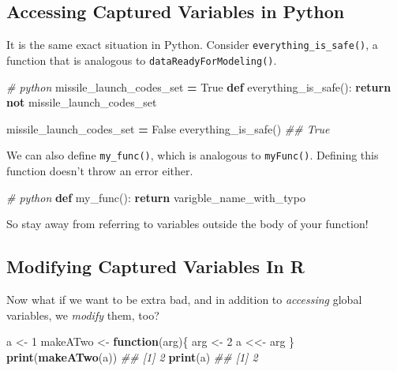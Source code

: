 \documentclass[12pt,krantz2]{krantz}
\makeatletter
\newenvironment{Shaded}{\begin{snugshade}}{\end{snugshade}}
\newcommand{\CommentTok}[1]{\textcolor[rgb]{0.37,0.37,0.37}{\textit{#1}}}
\newcommand{\ControlFlowTok}[1]{\textcolor[rgb]{0.27,0.27,0.27}{\textbf{#1}}}
\newcommand{\DecValTok}[1]{\textcolor[rgb]{0.06,0.06,0.06}{#1}}
\newcommand{\KeywordTok}[1]{\textcolor[rgb]{0.27,0.27,0.27}{\textbf{#1}}}
\newcommand{\NormalTok}[1]{#1}
\newcommand{\OperatorTok}[1]{\textcolor[rgb]{0.43,0.43,0.43}{\textbf{#1}}}
\newcommand{\StringTok}[1]{\textcolor[rgb]{0.5,0.5,0.5}{#1}}
\newcommand{\VariableTok}[1]{\textcolor[rgb]{0,0,0}{#1}}
\newenvironment{kframe}{%
\medskip{}
\setlength{\fboxsep}{.8em}
 \def\at@end@of@kframe{}%
 \ifinner\ifhmode%
  \def\at@end@of@kframe{\end{minipage}}%
  \begin{minipage}{\columnwidth}%
 \fi\fi%
 \def\FrameCommand##1{\hskip\@totalleftmargin \hskip-\fboxsep
 \colorbox{shadecolor}{##1}\hskip-\fboxsep
     \hskip-\linewidth \hskip-\@totalleftmargin \hskip\columnwidth}%
 \MakeFramed {\advance\hsize-\width
   \@totalleftmargin\z@ \linewidth\hsize
   \@setminipage}}%
 {\par\unskip\endMakeFramed%
 \at@end@of@kframe}
\renewenvironment{Shaded}{\begin{kframe}}{\end{kframe}}
\makeatother
\begin{document}
\hypertarget{accessing-captured-variables-in-python}{%
\subsection{Accessing Captured Variables in Python}\label{accessing-captured-variables-in-python}}

It is the same exact situation in Python. Consider \texttt{everything\_is\_safe()}, a function that is analogous to \texttt{dataReadyForModeling()}.

\begin{Shaded}
\begin{Highlighting}[]
\CommentTok{# python}
\NormalTok{missile_launch_codes_set }\OperatorTok{=} \VariableTok{True}
\KeywordTok{def}\NormalTok{ everything_is_safe():}
    \ControlFlowTok{return} \KeywordTok{not}\NormalTok{ missile_launch_codes_set}

\NormalTok{missile_launch_codes_set }\OperatorTok{=} \VariableTok{False}
\NormalTok{everything_is_safe()}
\CommentTok{## True}
\end{Highlighting}
\end{Shaded}

We can also define \texttt{my\_func()}, which is analogous to \texttt{myFunc()}. Defining this function doesn't throw an error either.

\begin{Shaded}
\begin{Highlighting}[]
\CommentTok{# python}
\KeywordTok{def}\NormalTok{ my_func():}
    \ControlFlowTok{return}\NormalTok{ varigble_name_with_typo}
\end{Highlighting}
\end{Shaded}

So stay away from referring to variables outside the body of your function!

\hypertarget{modifying-captured-variables-in-r}{%
\subsection{Modifying Captured Variables In R}\label{modifying-captured-variables-in-r}}

Now what if we want to be extra bad, and in addition to \emph{accessing} global variables, we \emph{modify} them, too?

\begin{Shaded}
\begin{Highlighting}[]
\NormalTok{a <-}\StringTok{ }\DecValTok{1}
\NormalTok{makeATwo <-}\StringTok{ }\ControlFlowTok{function}\NormalTok{(arg)\{}
\NormalTok{  arg <-}\StringTok{ }\DecValTok{2}
\NormalTok{  a <<-}\StringTok{ }\NormalTok{arg}
\NormalTok{\}}
\KeywordTok{print}\NormalTok{(}\KeywordTok{makeATwo}\NormalTok{(a))}
\CommentTok{## [1] 2}
\KeywordTok{print}\NormalTok{(a)}
\CommentTok{## [1] 2}
\end{Highlighting}
\end{Shaded}
\end{document}
